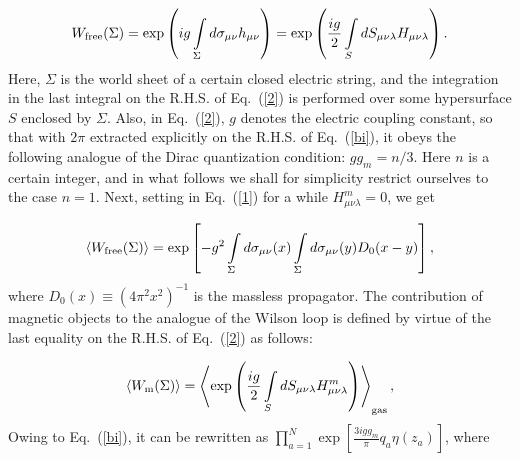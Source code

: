 \documentclass[a4paper,12pt]{article}
\begin{document}
\begin{equation}
\label{2}
W_{\rm free}(\Sigma)=\exp\left(ig\int\limits_{\Sigma}^{}d\sigma_{\mu\nu}h_{\mu\nu}\right)=\exp\left(\frac{ig}{2}
\int\limits_{S}^{} dS_{\mu\nu\lambda}H_{\mu\nu\lambda}\right).
\end{equation}
Here, $\Sigma$ is the world sheet of a certain closed electric string, and the integration in the 
last integral on the R.H.S. of Eq.~(\ref{2}) is performed over some hypersurface $S$ enclosed by $\Sigma$.
Also, in Eq.~(\ref{2}), $g$ denotes the electric coupling constant, so that with $2\pi$ extracted 
explicitly on the R.H.S. of Eq.~(\ref{bi}), it obeys the following analogue of the Dirac quantization 
condition: $gg_m=n/3$. 
Here $n$ is a certain integer, and in what follows we shall for simplicity restrict
ourselves to the case $n=1$. Next, 
setting in Eq.~(\ref{1}) for a while $H_{\mu\nu\lambda}^m=0$, we get 

\begin{equation}
\label{3}
\left<W_{\rm free}(\Sigma)\right>=\exp\left[-g^2\int\limits_{\Sigma}^{} 
d\sigma_{\mu\nu}(x)\int\limits_{\Sigma}^{} d\sigma_{\mu\nu}(y)D_0(x-y)\right],
\end{equation}
where $D_0(x)\equiv\left(4\pi^2x^2\right)^{-1}$ is the massless propagator. The contribution of magnetic objects
to the analogue of the Wilson loop is defined by virtue of the last equality on the R.H.S. of Eq.~(\ref{2}) as follows:

\begin{equation}
\label{4}
\left<W_{\rm m}(\Sigma)\right>=\left<\exp\left(\frac{ig}{2}\int\limits_{S}^{} 
dS_{\mu\nu\lambda}H_{\mu\nu\lambda}^m\right)\right>_{\rm gas},
\end{equation}
Owing to Eq.~(\ref{bi}), it can be rewritten as 
$\prod\limits_{a=1}^{N}\exp\left[\frac{3igg_m}{\pi}q_a\eta(z_a)\right]$, where 
\end{document}
